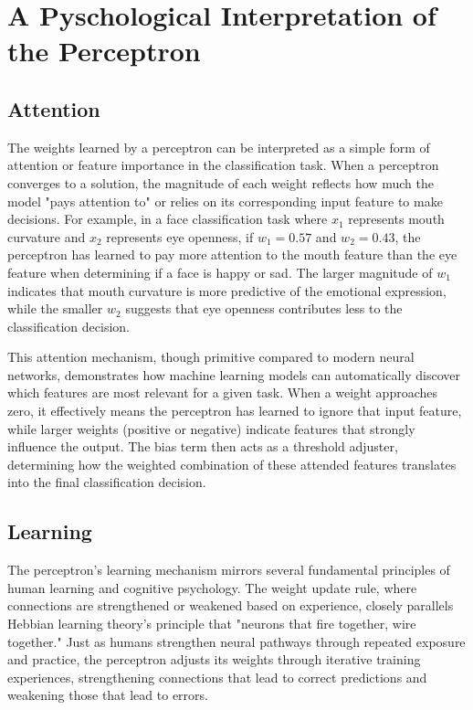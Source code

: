 \section{A Pyschological Interpretation of the Perceptron}
\subsection{Attention}
The weights learned by a perceptron can be interpreted as a simple form of attention or feature importance in the classification task. When a perceptron converges to a solution, the magnitude of each weight reflects how much the model "pays attention to" or relies on its corresponding input feature to make decisions.
For example, in a face classification task where $x_1$ represents mouth curvature and $x_2$ represents eye openness, if $w_1 = 0.57$ and $w_2 = 0.43$, the perceptron has learned to pay more attention to the mouth feature than the eye feature when determining if a face is happy or sad. The larger magnitude of $w_1$ indicates that mouth curvature is more predictive of the emotional expression, while the smaller $w_2$ suggests that eye openness contributes less to the classification decision.

This attention mechanism, though primitive compared to modern neural networks, demonstrates how machine learning models can automatically discover which features are most relevant for a given task. When a weight approaches zero, it effectively means the perceptron has learned to ignore that input feature, while larger weights (positive or negative) indicate features that strongly influence the output. The bias term then acts as a threshold adjuster, determining how the weighted combination of these attended features translates into the final classification decision.

\subsection{Learning}
The perceptron's learning mechanism mirrors several fundamental principles of human learning and cognitive psychology. The weight update rule, where connections are strengthened or weakened based on experience, closely parallels Hebbian learning theory's principle that "neurons that fire together, wire together." Just as humans strengthen neural pathways through repeated exposure and practice, the perceptron adjusts its weights through iterative training experiences, strengthening connections that lead to correct predictions and weakening those that lead to errors.

